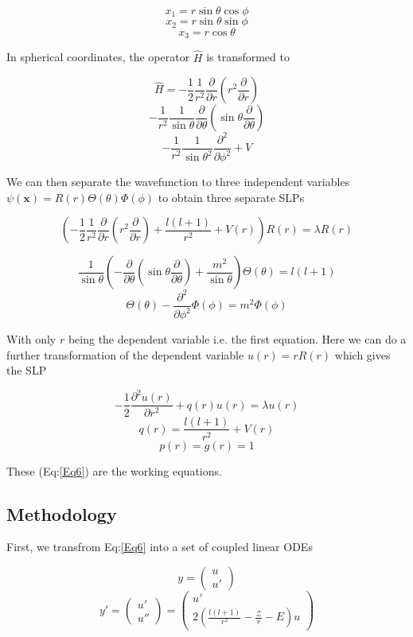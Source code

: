\documentclass[11pt,a4paper]{article}
\begin{document}
\[
x_1 = r\sin{\theta}\cos{\phi}
\]
\[
x_2 = r\sin{\theta}\sin{\phi}
\]
\[
x_3 = r\cos{\theta}
\]

In spherical coordinates, the operator \(\hat{H}\) is transformed to

\[
\hat{H} = -\frac{1}{2}\frac{1}{r^2}\frac{\partial}{\partial r} \left( r^2 \frac{\partial}{\partial r} \right)
\]
\[
   -\frac{1}{r^2}\frac{1}{\sin{\theta}}\frac{\partial}{\partial\theta} \left(\sin{\theta}\frac{\partial}{\partial\theta} \right)
\]
\[
   -\frac{1}{r^2}\frac{1}{\sin{\theta}^2}\frac{\partial^2}{\partial\phi^2} + V
\]

We can then separate the wavefunction to three independent variables
\(\psi(\mathbf{x})=R(r)\Theta(\theta)\Phi(\phi)\) to obtain three separate SLPs

\[
\left (
-\frac{1}{2}\frac{1}{r^2}\frac{\partial}{\partial r} \left( r^2 \frac{\partial}{\partial r} \right) + \frac{l(l+1)}{r^2} + V(r) \right)R(r) = \lambda R(r)
\]

\[
\frac{1}{\sin{\theta}}\left (-\frac{\partial}{\partial \theta} \left( \sin{\theta} \frac{\partial}{\partial \theta} \right)+ \frac{m^2}{\sin{\theta}} \right)\Theta(\theta) = l(l+1)
\]
\[
\Theta(\theta)-\frac{\partial^2}{\partial \phi^2}\Phi(\phi) = m^2 \Phi(\phi)
\]

With only \(r\) being the dependent variable i.e. the first equation.
Here we can do a further transformation of the dependent variable
\(u(r) = r R(r)\) which gives the SLP

\[
-\frac{1}{2}\frac{\partial^2 u(r)}{\partial r^2}+ q(r) u(r) = \lambda u(r)
\]
\[
q(r) = \frac{l(l+1)}{r^2} + V(r)
\]
\[
p(r) = g(r) = 1
\]

These (Eq:\ref{Eq6}) are the working equations.

\subsection{Methodology}
\label{sec:org5cda928}

First, we transfrom Eq:\ref{Eq6} into a set of coupled linear
ODEs

\[
y = \begin{pmatrix} u \\ u' \end{pmatrix}
\]
\[
y' = \begin{pmatrix} u' \\ u'' \end{pmatrix} = \begin{pmatrix} u' \\ 2\left( \frac{l(l+1)}{r^2} -\frac{\mathcal{Z}}{r} - E \right) u \end{pmatrix}
\]
\end{document}
